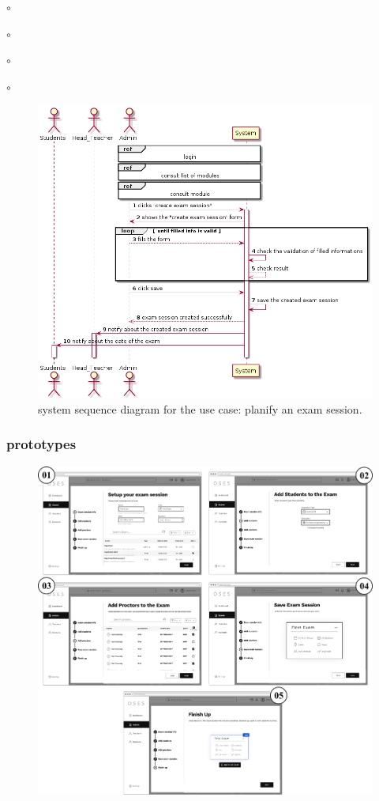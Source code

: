 \documentclass[]{uc2pfecaneva}
\begin{document}
\begin{list}{$\circ$}{}
\begin{list}{$\circ$}{}
\begin{list}{$\circ$}{}
\begin{list}{$\circ$}{}
\begin{figure}[h]
        \centering
        \includegraphics[width=\textwidth]{images/create_exam_session}

        \caption{system sequence diagram for the use case: planify an exam session.}
    \end{figure}
    \clearpage

    \subsubsection{prototypes}
    \begin{figure}[h]

        \centering
        \includegraphics[width=\textwidth]{images/prototypes_create_exam_session}


\end{figure}
\end{list}
\end{list}
\end{list}
\end{list}
\end{document}
